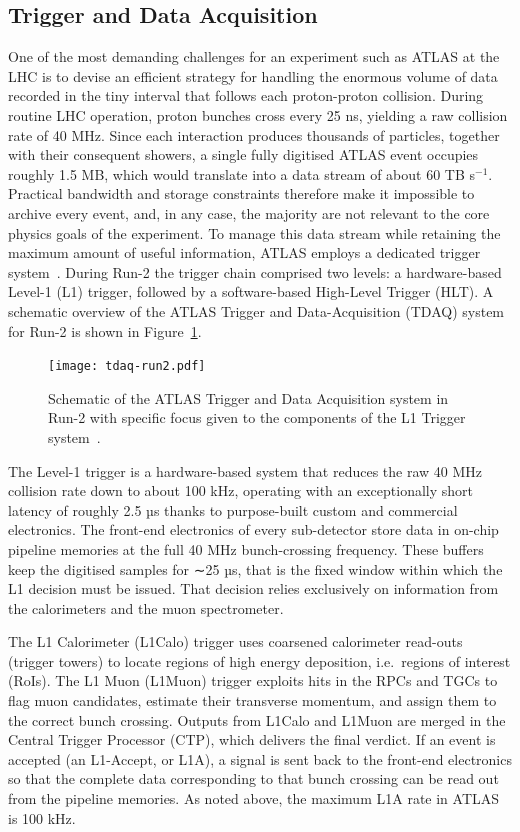 \subsection{Trigger and Data Acquisition}
\label{sec:trigger}
One of the most demanding challenges for an experiment such as ATLAS at the LHC is to devise an efficient strategy for handling the enormous volume of data recorded in the tiny interval that follows each proton-proton collision. During routine LHC operation, proton bunches cross every 25 ns, yielding a raw collision rate of 40 MHz. Since each interaction produces thousands of particles, together with their consequent showers, a single fully digitised ATLAS event occupies roughly 1.5 MB, which would translate into a data stream of about 60 TB s$^{-1}$. Practical bandwidth and storage constraints therefore make it impossible to archive every event, and, in any case, the majority are not relevant to the core physics goals of the experiment. To manage this data stream while retaining the maximum amount of useful information, ATLAS employs a dedicated trigger system~\cite{trigger_run2}. During Run-2 the trigger chain comprised two levels: a hardware-based Level-1 (L1) trigger, followed by a software-based High-Level Trigger (HLT). A schematic overview of the ATLAS Trigger and Data-Acquisition (TDAQ) system for Run-2 is shown in Figure~\ref{fig:trigger_system}.
\begin{figure}[htbp]
    \centering
        \texttt{[image: tdaq-run2.pdf]}
    \caption{Schematic of the ATLAS Trigger and Data Acquisition system in Run-2 with specific focus given to the components of the L1 Trigger system~\cite{atlas_daq_run2}.}
    \label{fig:trigger_system}
\end{figure}

The Level-1 trigger is a hardware-based system that reduces the raw 40 MHz collision rate down to about 100 kHz, operating with an exceptionally short latency of roughly 2.5 µs thanks to purpose-built custom and commercial electronics. The front-end electronics of every sub-detector store data in on-chip pipeline memories at the full 40 MHz bunch-crossing frequency. These buffers keep the digitised samples for ∼25 µs, that is the fixed window within which the L1 decision must be issued. That decision relies exclusively on information from the calorimeters and the muon spectrometer.

The L1 Calorimeter (L1Calo) trigger uses coarsened calorimeter read-outs (trigger towers) to locate regions of high energy deposition, i.e.\ regions of interest (RoIs). The L1 Muon (L1Muon) trigger exploits hits in the RPCs and TGCs to flag muon candidates, estimate their transverse momentum, and assign them to the correct bunch crossing. Outputs from L1Calo and L1Muon are merged in the Central Trigger Processor (CTP), which delivers the final verdict. If an event is accepted (an L1-Accept, or L1A), a signal is sent back to the front-end electronics so that the complete data corresponding to that bunch crossing can be read out from the pipeline memories. As noted above, the maximum L1A rate in ATLAS is 100 kHz.

